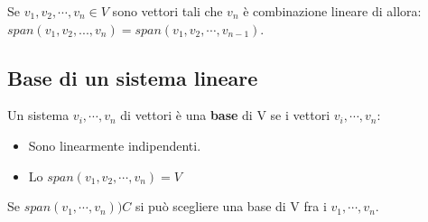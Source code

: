 \begin{proposition}
Se $v_1, v_2, \cdots, v_n \in V$ sono vettori tali che $v_n$ è combinazione lineare di allora: $span(v_1, v_2, ..., v_n) = span(v_1, v_2, \cdots, v_{n-1})$.
\end{proposition}

\subsection{Base di un sistema lineare}
\begin{definition}
Un sistema $v_i, \cdots, v_n$ di vettori è una \textbf{base} di V se i vettori $v_i, \cdots, v_n$:
\begin{itemize}
    \item Sono linearmente indipendenti.
    \item Lo $span(v_1, v_2, \cdots, v_n) = V$
\end{itemize}
\end{definition}

\begin{corollaries}
Se $span(v_1, \cdots, v_n) ) C$ si può scegliere una base di V fra i $v_1, \cdots, v_n$.
\end{corollaries}

